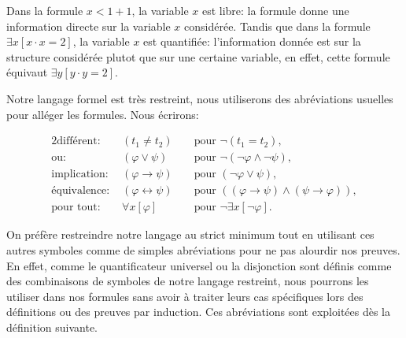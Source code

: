 \begin{exem}
Dans la formule $x < 1 + 1$, la variable $x$ est libre: la formule donne une information directe sur la variable $x$ considérée. Tandis que 
dans la formule $ \exists x [x \cdot x = 2]$, la variable $x$ est quantifiée: l'information donnée est sur la structure considérée plutot que sur une certaine variable, 
en effet, cette formule équivaut $ \exists y [y \cdot y = 2]$.
\end{exem}

\begin{rema}[Abréviations]
Notre langage formel est très restreint, nous utiliserons des abréviations usuelles
pour alléger les formules. Nous écrirons:

\begin{alignat*}{2}
\text{différent: } &(t_1 \neq t_2) && \text{ pour } \neg(t_1 = t_2), \\
\text{ou: } &(\varphi \vee \psi) && \text{ pour } \neg(\neg\varphi \wedge \neg\psi), \\
\text{implication: } &(\varphi \rightarrow \psi) && \text{ pour } (\neg\varphi \vee \psi), \\
\text{équivalence: } &(\varphi \leftrightarrow \psi) && \text{ pour } ((\varphi \rightarrow \psi) \wedge (\psi \rightarrow \varphi)), \\
\text{pour tout: } &\forall x[\varphi] && \text{ pour } \neg{\exists}x[\neg\varphi].
\end{alignat*}

On préfère restreindre notre langage au strict minimum tout en utilisant ces
autres symboles comme de simples abréviations pour ne pas alourdir nos preuves.
En effet, comme le quantificateur universel ou la disjonction sont définis comme 
des combinaisons de symboles de notre langage restreint, nous pourrons les utiliser
dans nos formules sans avoir à traiter leurs cas spécifiques lors des définitions ou des preuves par induction. 
Ces abréviations sont exploitées dès la définition suivante.
\end{rema}

